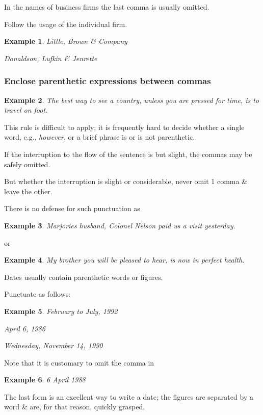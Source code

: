 \documentclass{article}
\newtheorem{example}{Example}
\begin{document}
In the names of business firms the last comma is usually omitted.

Follow the usage of the individual firm.
\begin{example}
	Little, Brown \& Company
	
	Donaldson, Lufkin \& Jenrette
\end{example}


\subsubsection{Enclose parenthetic expressions between commas}
\begin{example}
	The best way to see a country, unless you are pressed for time, is to travel on foot.
\end{example}
This rule is difficult to apply; it is frequently hard to decide whether a single word, e.g., {\it however}, or a brief phrase is or is not parenthetic.

If the interruption to the flow of the sentence is but slight, the commas may be safely omitted.

But whether the interruption is slight or considerable, never omit 1 comma \& leave the other.

There is no defense for such punctuation as
\begin{example}
	Marjories husband, Colonel Nelson paid us a visit yesterday.
\end{example}
or
\begin{example}
	My brother you will be pleased to hear, is now in perfect health.
\end{example}
Dates usually contain parenthetic words or figures.

Punctuate as follows:
\begin{example}
	February to July, 1992
	
	April 6, 1986
	
	Wednesday, November 14, 1990
\end{example}
Note that it is customary to omit the comma in
\begin{example}
	6 April 1988
\end{example}
The last form is an excellent way to write a date; the figures are separated by a word \& are, for that reason, quickly grasped.
\end{document}

